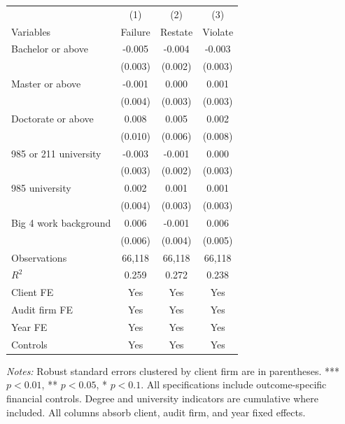 \documentclass[10pt]{article}
\begin{document}
\begin{minipage}{19cm}\fontsize{10}{12}\selectfont\setlength{\tabcolsep}{4pt}\renewcommand{\arraystretch}{1.12}


\centering
{}
\begin{threeparttable}
\begin{tabular}{p{}ccc}
\toprule
 & (1) & (2) & (3) \\
Variables & Failure & Restate & Violate \\
\midrule
Bachelor or above & -0.005 & -0.004 & -0.003 \\
 & (0.003) & (0.002) & (0.003) \\
Master or above & -0.001 & 0.000 & 0.001 \\
 & (0.004) & (0.003) & (0.003) \\
Doctorate or above & 0.008 & 0.005 & 0.002 \\
 & (0.010) & (0.006) & (0.008) \\
985 or 211 university & -0.003 & -0.001 & 0.000 \\
 & (0.003) & (0.002) & (0.003) \\
985 university & 0.002 & 0.001 & 0.001 \\
 & (0.004) & (0.003) & (0.003) \\
Big 4 work background & 0.006 & -0.001 & 0.006 \\
 & (0.006) & (0.004) & (0.005) \\
Observations & 66,118 & 66,118 & 66,118 \\
$R^{2}$ & 0.259 & 0.272 & 0.238 \\
Client FE & Yes & Yes & Yes \\
Audit firm FE & Yes & Yes & Yes \\
Year FE & Yes & Yes & Yes \\
Controls & Yes & Yes & Yes \\
\bottomrule
\end{tabular}
\begin{tablenotes}\fontsize{9}{11}\selectfont
\item \raggedright \fontsize{9}{11}\selectfont \textit{Notes:} Robust standard errors clustered by client firm are in parentheses. *** $p<0.01$, ** $p<0.05$, * $p<0.1$. All specifications include outcome-specific financial controls. Degree and university indicators are cumulative where included.
All columns absorb client, audit firm, and year fixed effects.
\end{tablenotes}
\end{threeparttable}

\end{minipage}
\end{document}

